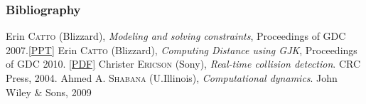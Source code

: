 \documentclass{beamer}
\begin{document}
\begin{frame}
 \frametitle{Bibliography} 
  \begin{thebibliography}{9}
   Erin \textsc{Catto} (Blizzard), \emph{Modeling and solving constraints}, Proceedings of GDC 2007.\href{http://box2d.org/files/GDC2007/GDC2007_Catto_Erin_Physics1.ppt}{[PPT]} 
   Erin \textsc{Catto} (Blizzard), \emph{Computing Distance using GJK}, Proceedings of GDC 2010. \href{http://box2d.org/files/GDC2010/GDC2010_Catto_Erin_GJK.pdf}{[PDF]}
   Christer \textsc{Ericson} (Sony), \emph{Real-time collision detection}. CRC Press, 2004.
   Ahmed A. \textsc{Shabana} (U.Illinois), \emph{Computational dynamics}. John Wiley \& Sons, 2009
  \end{thebibliography}
\end{frame}
\end{document}
